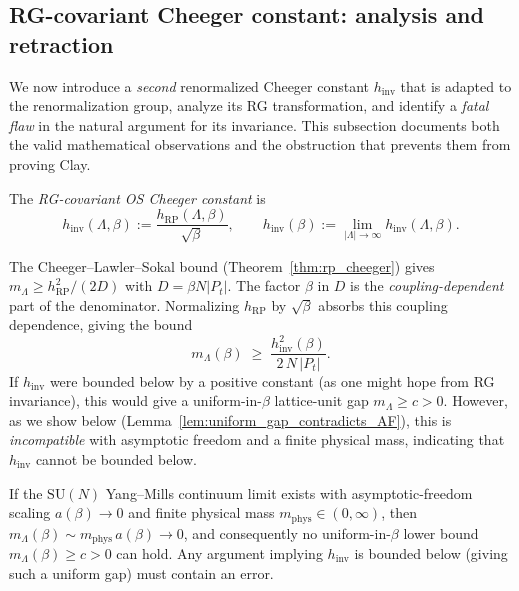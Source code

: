 \subsection{RG-covariant Cheeger constant: analysis and retraction}
\label{ssec:rg_covariance}

We now introduce a \emph{second} renormalized Cheeger constant
$h_{\mathrm{inv}}$ that is adapted to the renormalization group,
analyze its RG transformation, and identify a \emph{fatal flaw}
in the natural argument for its invariance. This subsection
documents both the valid mathematical observations and the
obstruction that prevents them from proving Clay.

\begin{definition}
\label{def:h_inv}
The \emph{RG-covariant OS Cheeger constant} is
\begin{equation}
\label{eq:h_inv_def}
  h_{\mathrm{inv}}(\Lambda,\beta)
  :=\frac{h_{\mathrm{RP}}(\Lambda,\beta)}{\sqrt{\beta}},
  \qquad
  h_{\mathrm{inv}}(\beta):=\lim_{|\Lambda|\to\infty}h_{\mathrm{inv}}(\Lambda,\beta).
\end{equation}
\end{definition}

\begin{remark}
\label{rem:h_inv_motivation}
The Cheeger--Lawler--Sokal bound
(Theorem~\ref{thm:rp_cheeger}) gives
$m_{\Lambda}\ge h_{\mathrm{RP}}^{2}/(2D)$ with
$D=\beta N|P_{t}|$. The factor $\beta$ in $D$ is the
\emph{coupling-dependent} part of the denominator. Normalizing
$h_{\mathrm{RP}}$ by $\sqrt{\beta}$ absorbs this coupling
dependence, giving the bound
\begin{equation}
\label{eq:h_inv_gap}
  m_{\Lambda}(\beta)\;\ge\;\frac{h_{\mathrm{inv}}^{2}(\beta)}
       {2\,N\,|P_{t}|}.
\end{equation}
If $h_{\mathrm{inv}}$ were bounded below by a positive constant
(as one might hope from RG invariance), this would give a
uniform-in-$\beta$ lattice-unit gap $m_{\Lambda}\ge c>0$.
However, as we show below (Lemma~\ref{lem:uniform_gap_contradicts_AF}),
this is \emph{incompatible} with asymptotic freedom and a finite
physical mass, indicating that $h_{\mathrm{inv}}$ cannot be
bounded below.
\end{remark}

\begin{lemma}
\label{lem:uniform_gap_contradicts_AF}
If the $\mathrm{SU}(N)$ Yang--Mills continuum limit exists with
asymptotic-freedom scaling $a(\beta)\to0$ and finite physical
mass $m_{\mathrm{phys}}\in(0,\infty)$, then
$m_{\Lambda}(\beta)\sim m_{\mathrm{phys}}\,a(\beta)\to0$, and
consequently no uniform-in-$\beta$ lower bound
$m_{\Lambda}(\beta)\ge c>0$ can hold. Any argument implying
$h_{\mathrm{inv}}$ is bounded below (giving such a uniform gap)
must contain an error.
\end{lemma}

